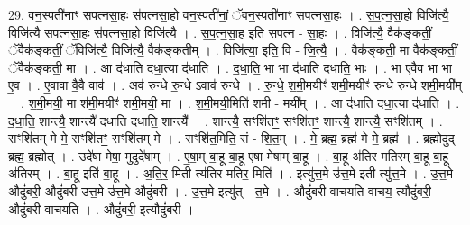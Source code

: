 \documentclass[17pt]{extarticle}
\begin{document}
29. वन॒स्पती॑नाꣳ सपत्नसा॒हः स॑पत्नसा॒हो वन॒स्पती॑नां॒ ॅवन॒स्पती॑नाꣳ सपत्नसा॒हः । . स॒प॒त्न॒सा॒हो विजि॑त्यै॒ विजि॑त्यै सपत्नसा॒हः स॑पत्नसा॒हो विजि॑त्यै । . स॒प॒त्न॒सा॒ह इति॑ सपत्न - सा॒हः । . विजि॑त्यै॒ वैक॑ङ्कतीं॒ ॅवैक॑ङ्कतीं॒ ॅविजि॑त्यै॒ विजि॑त्यै॒ वैक॑ङ्कतीम् । . विजि॑त्या॒ इति॒ वि - जि॒त्यै॒ । . वैक॑ङ्कती॒ मा वैक॑ङ्कतीं॒ ॅवैक॑ङ्कती॒ मा । . आ द॑धाति दधा॒त्या द॑धाति । . द॒धा॒ति॒ भा भा द॑धाति दधाति॒ भाः । . भा ए॒वैव भा भा ए॒व । . ए॒वावा वै॒वै वाव॑ । . अव॑ रुन्धे रु॒न्धे ऽवाव॑ रुन्धे । . रु॒न्धे॒ श॒मी॒मयीꣳ॑ शमी॒मयीꣳ॑ रुन्धे रुन्धे शमी॒मयी᳚म् । . श॒मी॒मयी॒ मा श॑मी॒मयीꣳ॑ शमी॒मयी॒ मा । . श॒मी॒मयी॒मिति॑ शमी - मयी᳚म् । . आ द॑धाति दधा॒त्या द॑धाति । . द॒धा॒ति॒ शान्त्यै॒ शान्त्यै॑ दधाति दधाति॒ शान्त्यै᳚ । . शान्त्यै॒ सꣳशि॑तꣳ॒॒ सꣳशि॑तꣳ॒॒ शान्त्यै॒ शान्त्यै॒ सꣳशि॑तम् । . सꣳशि॑तम् मे मे॒ सꣳशि॑तꣳ॒॒ सꣳशि॑तम् मे । . सꣳशि॑त॒मिति॒ सं - शि॒त॒म् । . मे॒ ब्रह्म॒ ब्रह्म॑ मे मे॒ ब्रह्म॑ । . ब्रह्मोदुद् ब्रह्म॒ ब्रह्मोत् । . उदे॑षा मेषा॒ मुदुदे॑षाम् । . ए॒षा॒म् बा॒हू बा॒हू ए॑षा मेषाम् बा॒हू । . बा॒हू अ॑तिर मतिरम् बा॒हू बा॒हू अ॑तिरम् । . बा॒हू इति॑ बा॒हू । . अ॒ति॒र॒ मिती त्य॑तिर मतिर॒ मिति॑ । . इत्यु॑त्त॒मे उ॑त्त॒मे इती त्यु॑त्त॒मे । . उ॒त्त॒मे औदुं॑बरी॒ औदुं॑बरी उत्त॒मे उ॑त्त॒मे औदुं॑बरी । . उ॒त्त॒मे इत्यु॑त् - त॒मे । . औदुं॑बरी वाचयति वाचय॒ त्यौदुं॑बरी॒ औदुं॑बरी वाचयति । . औदुं॑बरी॒ इत्यौदुं॑बरी । \newline
\end{document}
